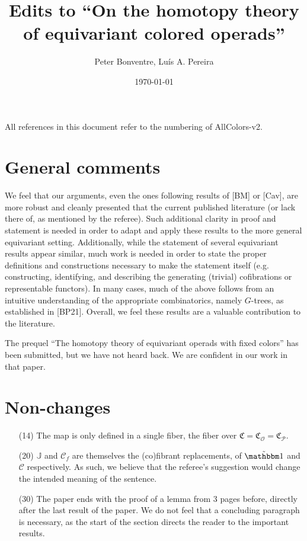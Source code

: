 \documentclass[a4paper,10pt
]{article}%
\title{Edits to ``On the homotopy theory of equivariant colored operads''}
\author{Peter Bonventre, Lu\'is A. Pereira}%
\date{\today}
\numberwithin{equation}{section}
\numberwithin{figure}{section}
\theoremstyle{definition} %
\renewcommand{\O}{\ensuremath{\mathcal O}}
\renewcommand{\P}{\ensuremath{\mathcal P}}
\newcommand{\1}{\ensuremath{\mathbbm 1}}%
\begin{document}
 
  
\maketitle
 


All references in this document refer to the numbering of AllColors-v2.



\section{General comments}

We feel that
our arguments, even the ones following results of [BM] or [Cav], are more robust and cleanly presented that the current published literature (or lack there of, as mentioned by the referee).
Such additional clarity in proof and statement is needed in order to adapt and apply these results to the more general equivariant setting.
Additionally, while the statement of several equivariant results appear similar, much work is needed in order to state the proper definitions and constructions necessary to make the statement itself
(e.g. constructing, identifying, and describing the generating (trivial) cofibrations or representable functors).
In many cases, much of the above follows from an intuitive understanding of the appropriate combinatorics, namely $G$-trees,
as established in [BP21].
Overall, we feel these results are a valuable contribution to the literature.

The prequel ``The homotopy theory of equivariant operads with fixed colors'' has been submitted, but we have not heard back.
We are confident in our work in that paper.

      

\section{Non-changes}

\begin{enumerate}
\item[(14)] The map is only defined in a single fiber, the fiber over $\mathfrak C = \mathfrak C_\O = \mathfrak C_\P$.
\item[(20)] $\mathbb J$ and $\mathcal C_f$ are themselves the (co)fibrant replacements, of $\tilde{\mathbbm 1}$ and $\mathcal C$ respectively. As such, we believe that the referee's suggestion would change the intended meaning of the sentence.
\item[(30)] The paper ends with the proof of a lemma from 3 pages before, directly after the last result of the paper. We do not feel that a concluding paragraph is necessary, as the start of the section directs the reader to the important results.
\end{enumerate}
\end{document}
